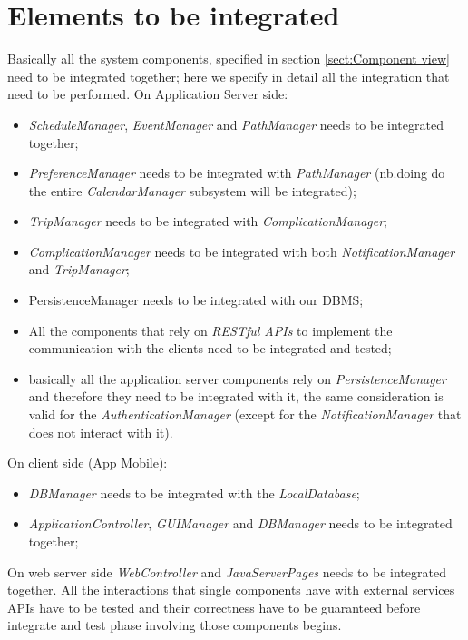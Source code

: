 \section{Elements to be integrated}
Basically all the system components, specified in section \ref{sect:Component view} need to be integrated together; here we specify in detail all the integration that need to be performed.
On Application Server side:
\begin{itemize}
	\item \textit{ScheduleManager}, \textit{EventManager} and \textit{PathManager} needs to be integrated together;
	\item \textit{PreferenceManager} needs to be integrated with \textit{PathManager} (nb.doing do the entire \textit{CalendarManager} subsystem will be integrated);
	\item \textit{TripManager} needs to be integrated with \textit{ComplicationManager};
	\item \textit{ComplicationManager} needs to be integrated with both \textit{NotificationManager} and \textit{TripManager};
	\item PersistenceManager needs to be integrated with our DBMS;
	\item All the components that rely on \textit{RESTful APIs} to implement the communication with the clients need to be integrated and tested;
	\item basically all the application server components rely on \textit{PersistenceManager} and therefore they need to be integrated with it, the same consideration is valid for the \textit{AuthenticationManager} (except for the \textit{NotificationManager} that does not interact with it).
\end{itemize}
On client side (App Mobile):
\begin{itemize}
	\item \textit{DBManager} needs to be integrated with the \textit{LocalDatabase};
	\item \textit{ApplicationController}, \textit{GUIManager} and \textit{DBManager} needs to be integrated together;
\end{itemize}
On web server side \textit{WebController} and \textit{JavaServerPages} needs to be integrated together.
All the interactions that single components have with external services APIs have to be tested and their correctness have to be guaranteed before integrate and test phase involving those components begins.

